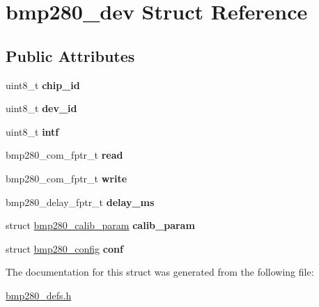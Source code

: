 \hypertarget{structbmp280__dev}{}\section{bmp280\+\_\+dev Struct Reference}
\label{structbmp280__dev}
\subsection*{Public Attributes}
\begin{DoxyCompactItemize}
\item 
\mbox{\label{structbmp280__dev_aad8e96e1b90095d7d29c304d1fd0eb7a}} 
uint8\+\_\+t {\bfseries chip\+\_\+id}
\item 
\mbox{\label{structbmp280__dev_a5904c4abdafcd25119f66872545af03a}} 
uint8\+\_\+t {\bfseries dev\+\_\+id}
\item 
\mbox{\label{structbmp280__dev_a086483a3cc1664868dbcc08bd84e5396}} 
uint8\+\_\+t {\bfseries intf}
\item 
\mbox{\label{structbmp280__dev_adb818ed44dfda1d195e99d7aa1752a38}} 
bmp280\+\_\+com\+\_\+fptr\+\_\+t {\bfseries read}
\item 
\mbox{\label{structbmp280__dev_a36c3231949d1a581274f92761da14bcf}} 
bmp280\+\_\+com\+\_\+fptr\+\_\+t {\bfseries write}
\item 
\mbox{\label{structbmp280__dev_ae854c30200407497fd96ce73ae2762a9}} 
bmp280\+\_\+delay\+\_\+fptr\+\_\+t {\bfseries delay\+\_\+ms}
\item 
\mbox{\label{structbmp280__dev_ade764b99d9fe1d3b273c74f3194c9d8f}} 
struct \mbox{\hyperlink{structbmp280__calib__param}{bmp280\+\_\+calib\+\_\+param}} {\bfseries calib\+\_\+param}
\item 
\mbox{\label{structbmp280__dev_a7a7f4b0cc9e0453862feb78c8b45856a}} 
struct \mbox{\hyperlink{structbmp280__config}{bmp280\+\_\+config}} {\bfseries conf}
\end{DoxyCompactItemize}


The documentation for this struct was generated from the following file\+:\begin{DoxyCompactItemize}
\item 
\mbox{\hyperlink{bmp280__defs_8h}{bmp280\+\_\+defs.\+h}}\end{DoxyCompactItemize}
